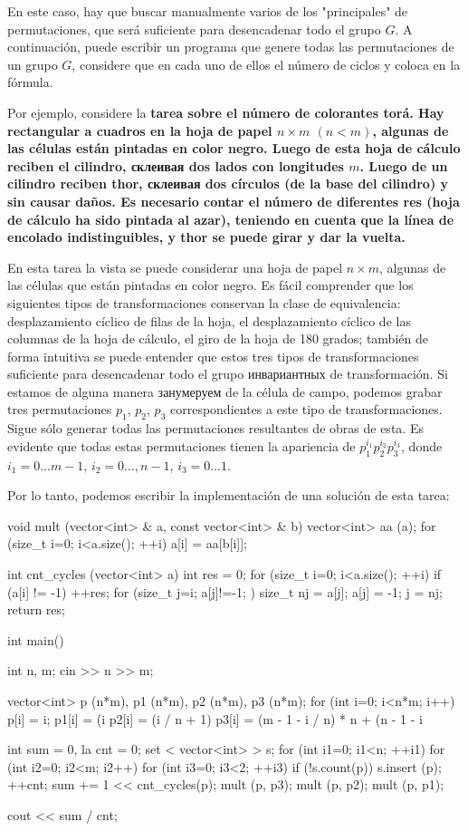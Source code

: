 En este caso, hay que buscar manualmente varios de los "principales" de permutaciones, que será suficiente para desencadenar todo el grupo $G$. A continuación, puede escribir un programa que genere todas las permutaciones de un grupo $G$, considere que en cada uno de ellos el número de ciclos y coloca en la fórmula.

Por ejemplo, considere la \bf{tarea sobre el número de colorantes torá}. Hay rectangular a cuadros en la hoja de papel $n \times m$ $(n < m)$, algunas de las células están pintadas en color negro. Luego de esta hoja de cálculo reciben el cilindro, склеивая dos lados con longitudes $m$. Luego de un cilindro reciben thor, склеивая dos círculos (de la base del cilindro) y sin causar daños. Es necesario contar el número de diferentes res (hoja de cálculo ha sido pintada al azar), teniendo en cuenta que la línea de encolado indistinguibles, y thor se puede girar y dar la vuelta.

En esta tarea la vista se puede considerar una hoja de papel $n \times m$, algunas de las células que están pintadas en color negro. Es fácil comprender que los siguientes tipos de transformaciones conservan la clase de equivalencia: desplazamiento cíclico de filas de la hoja, el desplazamiento cíclico de las columnas de la hoja de cálculo, el giro de la hoja de 180 grados; también de forma intuitiva se puede entender que estos tres tipos de transformaciones suficiente para desencadenar todo el grupo инвариантных de transformación. Si estamos de alguna manera занумеруем de la célula de campo, podemos grabar tres permutaciones $p_1$, $p_2$, $p_3$ correspondientes a este tipo de transformaciones. Sigue sólo generar todas las permutaciones resultantes de obras de esta. Es evidente que todas estas permutaciones tienen la apariencia de $p_1^{i_1} p_2^{i_2} p_3^{i_3}$, donde $i_1 = 0 \ldots m-1$, $i_2 = 0 \ldots, n-1$, $i_3 = 0 \ldots 1$.

Por lo tanto, podemos escribir la implementación de una solución de esta tarea:

\code
void mult (vector<int> & a, const vector<int> & b) {
vector<int> aa (a);
for (size_t i=0; i<a.size(); ++i)
a[i] = aa[b[i]];
}

int cnt_cycles (vector<int> a) {
int res = 0;
for (size_t i=0; i<a.size(); ++i)
if (a[i] != -1) {
++res;
for (size_t j=i; a[j]!=-1; ) {
size_t nj = a[j];
a[j] = -1;
j = nj;
}
}
return res;
}

int main() {
int n, m;
cin >> n >> m;

vector<int> p (n*m), p1 (n*m), p2 (n*m), p3 (n*m);
for (int i=0; i<n*m; i++) {
p[i] = i;
p1[i] = (i%
p2[i] = (i / n + 1) %
p3[i] = (m - 1 - i / n) * n + (n - 1 - i%
}

int sum = 0, la cnt = 0;
set < vector<int> > s;
for (int i1=0; i1<n; ++i1) {
for (int i2=0; i2<m; i2++) {
for (int i3=0; i3<2; ++i3) {
if (!s.count(p)) {
s.insert (p);
++cnt;
sum += 1 << cnt_cycles(p);
}
mult (p, p3);
}
mult (p, p2);
}
mult (p, p1);
}

cout << sum / cnt;
}
\endcode